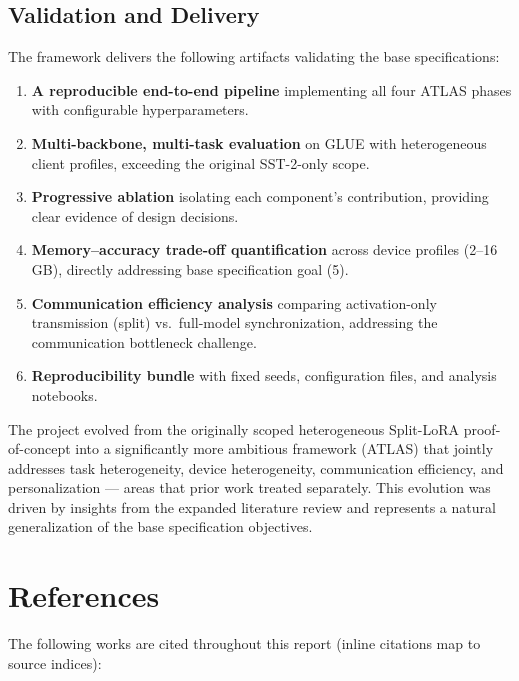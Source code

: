 \documentclass[11pt,a4paper]{article}
\begin{document}
\subsection{Validation and Delivery}

The framework delivers the following artifacts validating the base specifications:

\begin{enumerate}
\item \textbf{A reproducible end-to-end pipeline} implementing all four ATLAS phases with configurable hyperparameters.
\item \textbf{Multi-backbone, multi-task evaluation} on GLUE with heterogeneous client profiles, exceeding the original SST-2-only scope.
\item \textbf{Progressive ablation} isolating each component's contribution, providing clear evidence of design decisions.
\item \textbf{Memory--accuracy trade-off quantification} across device profiles (2--16 GB), directly addressing base specification goal (5).
\item \textbf{Communication efficiency analysis} comparing activation-only transmission (split) vs.\ full-model synchronization, addressing the communication bottleneck challenge.
\item \textbf{Reproducibility bundle} with fixed seeds, configuration files, and analysis notebooks.
\end{enumerate}

The project evolved from the originally scoped heterogeneous Split-LoRA proof-of-concept into a significantly more ambitious framework (ATLAS) that jointly addresses task heterogeneity, device heterogeneity, communication efficiency, and personalization --- areas that prior work treated separately. This evolution was driven by insights from the expanded literature review and represents a natural generalization of the base specification objectives.

\section{References}

The following works are cited throughout this report (inline citations map to source indices):
\end{document}
